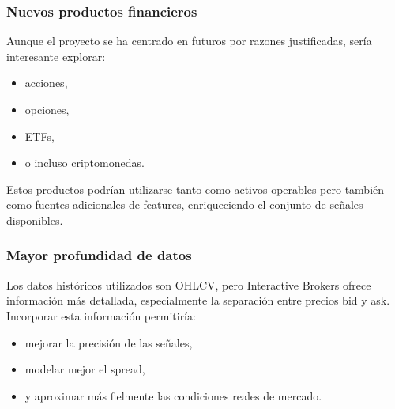 \subsubsection{Nuevos productos financieros}
Aunque el proyecto se ha centrado en futuros por razones justificadas, sería interesante explorar:

\begin{itemize}
    \item acciones,
    \item opciones,
    \item ETFs,
    \item o incluso criptomonedas.
\end{itemize}

Estos productos podrían utilizarse tanto como activos operables pero también como fuentes adicionales de features, enriqueciendo el conjunto de
señales disponibles.

\subsubsection{Mayor profundidad de datos}

Los datos históricos utilizados son OHLCV, pero Interactive Brokers ofrece información más detallada, especialmente la separación entre precios bid y
ask. Incorporar esta información permitiría:

\begin{itemize}
    \item mejorar la precisión de las señales,
    \item modelar mejor el spread,
    \item y aproximar más fielmente las condiciones reales de mercado.
\end{itemize}